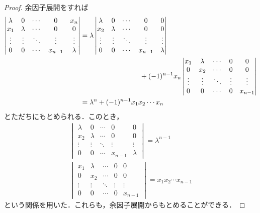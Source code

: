 \documentclass[a4paper,pdflatex,ja=standard]{bxjsarticle}
\begin{document}
\begin{enumerate}
  \begin{proof}
    余因子展開をすれば
    \begin{align}
      \begin{vmatrix}
        \lambda & 0 & \cdots & 0&x_{n} \\
        x_1 & \lambda & \cdots & 0&0 \\
        \vdots & \vdots & \ddots & \vdots & \vdots \\
        0 & 0 & \cdots & x_{n-1} & \lambda
      \end{vmatrix}
      &=
      \lambda
      \begin{vmatrix}
        \lambda & 0 & \cdots & 0&0 \\
        x_2 & \lambda & \cdots & 0&0 \\
        \vdots & \vdots & \ddots & \vdots & \vdots \\
        0 & 0 & \cdots & x_{n-1} & \lambda
      \end{vmatrix}
      \nonumber
      \\
      &\hspace*{3cm}
      +
      (-1)^{n-1}x_{n}
      \begin{vmatrix}
        x_{1} & \lambda & \cdots & 0&0 \\
        0 & x_{2} & \cdots & 0&0 \\
        \vdots & \vdots & \ddots & \vdots & \vdots \\
        0 & 0 & \cdots & 0 & x_{n-1}
      \end{vmatrix}
      \nonumber
      \\
      &=
      \lambda^{n}+(-1)^{n-1}x_{1}x_{2}\cdots x_{n}
    \end{align}
    とただちにもとめられる．このとき，
    \begin{gather}
      \begin{vmatrix}
        \lambda & 0 & \cdots & 0&0 \\
        x_2 & \lambda & \cdots & 0&0 \\
        \vdots & \vdots & \ddots & \vdots & \vdots \\
        0 & 0 & \cdots & x_{n-1} & \lambda
      \end{vmatrix}
      =
      \lambda^{n-1}
      \\
      \begin{vmatrix}
        x_{1} & \lambda & \cdots & 0&0 \\
        0 & x_{2} & \cdots & 0&0 \\
        \vdots & \vdots & \ddots & \vdots & \vdots \\
        0 & 0 & \cdots & 0 & x_{n-1}
      \end{vmatrix}
      =
      x_{1}x_{2}\cdots x_{n-1}
    \end{gather}
    という関係を用いた．これらも，余因子展開からもとめることができる．
  \end{proof}


\end{enumerate}
\end{document}
